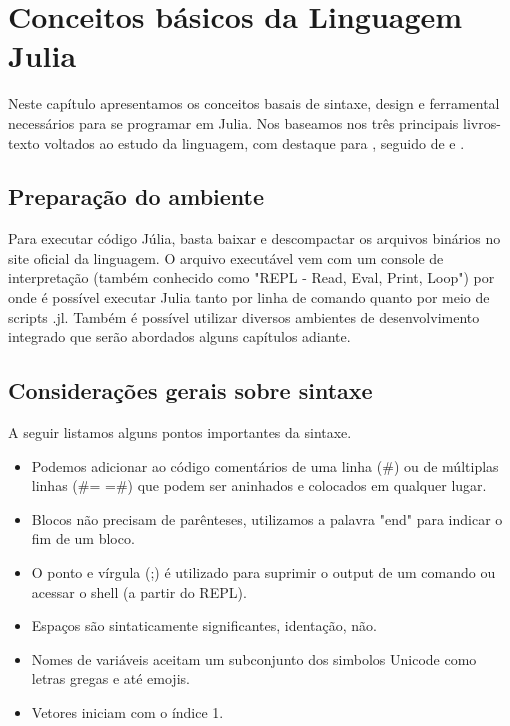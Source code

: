 %


\chapter{ Conceitos básicos da Linguagem Julia}

Neste capítulo apresentamos os conceitos basais de sintaxe, design e ferramental necessários para se programar em Julia. Nos baseamos nos três principais livros-texto voltados ao estudo da linguagem, com destaque para \cite{Lobianco2019}, seguido de \cite{Lauwens2019} e \cite{Kwong2020}.

\section{Preparação do ambiente}
Para executar código Júlia, basta baixar e descompactar os arquivos binários no site oficial da linguagem. O arquivo executável vem com um console de interpretação (também conhecido como "REPL - Read, Eval, Print, Loop") por onde é possível executar Julia tanto por linha de comando quanto por meio de scripts .jl. Também é possível utilizar diversos ambientes de desenvolvimento integrado que serão abordados alguns capítulos adiante.

\section{Considerações gerais sobre sintaxe}
A seguir listamos alguns pontos importantes da sintaxe. 
\begin{itemize}
    \item Podemos adicionar ao código comentários de uma linha (\#) ou de múltiplas linhas (\#= =\#) que podem ser aninhados e colocados em qualquer lugar.
    \item Blocos não precisam de parênteses, utilizamos a palavra "end" para indicar o fim de um bloco.
    \item O ponto e vírgula (;) é utilizado para suprimir o output de um comando ou acessar o shell (a partir do REPL).
    \item Espaços são sintaticamente significantes, identação, não. 
    \item Nomes de variáveis aceitam um subconjunto dos simbolos Unicode como letras gregas e até emojis. 
    \item Vetores iniciam com o índice 1. 
\end{itemize}

